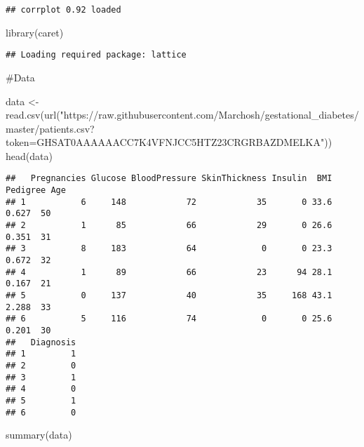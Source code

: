\documentclass[
]{article}
\newenvironment{Shaded}{\begin{snugshade}}{\end{snugshade}}
\newcommand{\FunctionTok}[1]{\textcolor[rgb]{0.00,0.00,0.00}{#1}}
\newcommand{\NormalTok}[1]{#1}
\newcommand{\OtherTok}[1]{\textcolor[rgb]{0.56,0.35,0.01}{#1}}
\newcommand{\StringTok}[1]{\textcolor[rgb]{0.31,0.60,0.02}{#1}}
\begin{document}
\begin{verbatim}
## corrplot 0.92 loaded
\end{verbatim}

\begin{Shaded}
\begin{Highlighting}[]
\FunctionTok{library}\NormalTok{(caret)}
\end{Highlighting}
\end{Shaded}

\begin{verbatim}
## Loading required package: lattice
\end{verbatim}

\#Data

\begin{Shaded}
\begin{Highlighting}[]
\NormalTok{data }\OtherTok{\textless{}{-}} \FunctionTok{read.csv}\NormalTok{(}\FunctionTok{url}\NormalTok{(}\StringTok{"https://raw.githubusercontent.com/Marchosh/gestational\_diabetes/master/patients.csv?token=GHSAT0AAAAAACC7K4VFNJCC5HTZ23CRGRBAZDMELKA"}\NormalTok{))}
\FunctionTok{head}\NormalTok{(data)}
\end{Highlighting}
\end{Shaded}

\begin{verbatim}
##   Pregnancies Glucose BloodPressure SkinThickness Insulin  BMI Pedigree Age
## 1           6     148            72            35       0 33.6    0.627  50
## 2           1      85            66            29       0 26.6    0.351  31
## 3           8     183            64             0       0 23.3    0.672  32
## 4           1      89            66            23      94 28.1    0.167  21
## 5           0     137            40            35     168 43.1    2.288  33
## 6           5     116            74             0       0 25.6    0.201  30
##   Diagnosis
## 1         1
## 2         0
## 3         1
## 4         0
## 5         1
## 6         0
\end{verbatim}

\begin{Shaded}
\begin{Highlighting}[]
\FunctionTok{summary}\NormalTok{(data)}
\end{Highlighting}
\end{Shaded}
\end{document}

